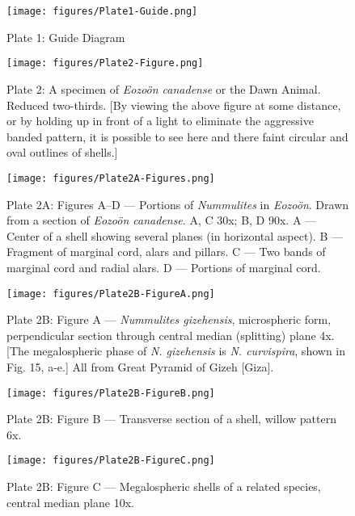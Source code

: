 \documentclass[a4paper, 12pt, oneside]{article}
\begin{document}
\clearpage
\begin{figure}[b]
\centering
\texttt{[image: figures/Plate1-Guide.png]}
\caption{\small Plate 1: Guide Diagram}
\end{figure}
\clearpage
{}
\cfoot{\thepage}
\begin{figure}[b]
\centering
\texttt{[image: figures/Plate2-Figure.png]}
\caption{\small Plate 2: A specimen of \emph{Eozoön canadense} or the Dawn Animal. Reduced two-thirds. [By viewing the above figure at some distance, or by holding up in front of a light to eliminate the aggressive banded pattern, it is possible to see here and there faint circular and oval outlines of shells.]}
\end{figure}
\clearpage
{}
\cfoot{\thepage}
\begin{figure}[b]
\centering
\texttt{[image: figures/Plate2A-Figures.png]}
\caption{\small Plate 2A: Figures A--D --- Portions of \emph{Nummulites} in \emph{Eozoön}. Drawn from a section of \emph{Eozoön canadense}. A, C 30x; B, D 90x. A --- Center of a shell showing several planes (in horizontal aspect). B --- Fragment of marginal cord, alars and pillars. C --- Two bands of marginal cord and radial alars. D --- Portions of marginal cord.}
\end{figure}
\clearpage
{}
\cfoot{\thepage}
\begin{figure}[b]
\centering
\texttt{[image: figures/Plate2B-FigureA.png]}
\caption{\small Plate 2B: Figure A --- \emph{Nummulites gizehensis}, microspheric form, perpendicular section through central median (splitting) plane 4x. [The megalospheric phase of \emph{N. gizehensis} is \emph{N. curvispira}, shown in Fig. 15, a-e.] All from Great Pyramid of Gizeh [Giza].}
\end{figure}
\clearpage
\begin{figure}[b]
\centering
\texttt{[image: figures/Plate2B-FigureB.png]}
\caption{\small Plate 2B: Figure B --- Transverse section of a shell, willow pattern 6x.}
\end{figure}
\clearpage
\begin{figure}[b]
\centering
\texttt{[image: figures/Plate2B-FigureC.png]}
\caption{\small Plate 2B: Figure C --- Megalospheric shells of a related species, central median plane 10x.}
\end{figure}
\end{document}
